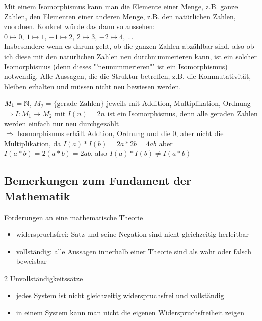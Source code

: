 \begin{*anmerkung}
	Mit einem Isomorphismus kann man die Elemente einer Menge, z.B. ganze Zahlen, den Elementen einer anderen Menge, z.B. den natürlichen Zahlen, zuordnen. Konkret würde das dann so aussehen: \\
	$0\mapsto 0$, $1\mapsto 1$, $-1\mapsto 2$, $2\mapsto 3$, $-2\mapsto 4$, ... \\
	Insbesondere wenn es darum geht, ob die ganzen Zahlen abzählbar sind, also ob ich diese mit den natürlichen Zahlen neu durchnummerieren kann, ist ein solcher Isomorphismus (denn dieses "'neunummerieren"' ist ein Isomorphismus) notwendig. Alle Aussagen, die die Struktur betreffen, z.B. die Kommutativität, bleiben erhalten und müssen nicht neu bewiesen werden.
\end{*anmerkung}

\begin{example}
	$M_1=\mathbb{N}$, $M_2=\{\text{gerade Zahlen}\}$ jeweils mit Addition, Multiplikation, Ordnung \\
	$\Rightarrow I: M_1\to M_2$ mit $I(n)=2n$ ist ein Isomorphismus, denn alle geraden Zahlen werden 
	einfach nur neu durchgezählt \\
	$\Rightarrow$ Isomorphismus erhält Addtion, Ordnung und die 0, aber nicht die Multiplikation, da
	$I(a)*I(b)=2a*2b=4ab$ aber $I(a*b)=2(a*b)=2ab$, also $I(a)*I(b)\neq I(a*b)$
\end{example}

\subsection{Bemerkungen zum Fundament der Mathematik}

Forderungen an eine mathematische Theorie
\begin{itemize}
	\item widerspruchsfrei: Satz und seine Negation sind nicht gleichzeitig herleitbar
	\item vollständig: alle Aussagen innerhalb einer Theorie sind als wahr oder falsch beweisbar
\end{itemize}

2 Unvollständigkeitssätze
\begin{itemize}
	\item jedes System ist nicht gleichzeitig widerspruchsfrei und vollständig
	\item in einem System kann man nicht die eigenen Widerspruchsfreiheit zeigen
\end{itemize}